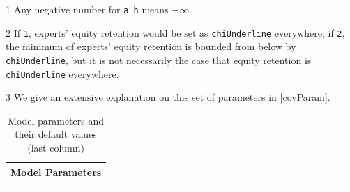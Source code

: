 \documentclass[12pt]{article}
\newcommand{\TFPhProg}{a\_h\xspace}
\newcommand{\equityConstraintProg}{chiUnderline\xspace}
\begin{document}
\begin{ThreePartTable}
	\begin{TableNotes}
	\item[1] Any negative number for \texttt{\TFPhProg} means $-\infty$.
	\item[2] If \texttt{1}, experts' equity retention would be set as \texttt{\equityConstraintProg} everywhere; if \texttt{2}, the minimum of experts' equity retention is bounded from below by \texttt{\equityConstraintProg}, but it is not necessarily the case that equity retention is \texttt{\equityConstraintProg} everywhere.
	\item[3] We give an extensive explanation on this set of parameters in \ref{covParam}.
	\end{TableNotes}
            \begin{longtable}{|c|c|c|c|}
            \caption{Model parameters and their default values (last column)}\label{table:modelParams}\\
                \hline
                \multicolumn{4}{|c|}{\textbf{Model Parameters}} \\
                        \endfirsthead

        \endfoot


\end{longtable}
\end{ThreePartTable}
\end{document}
